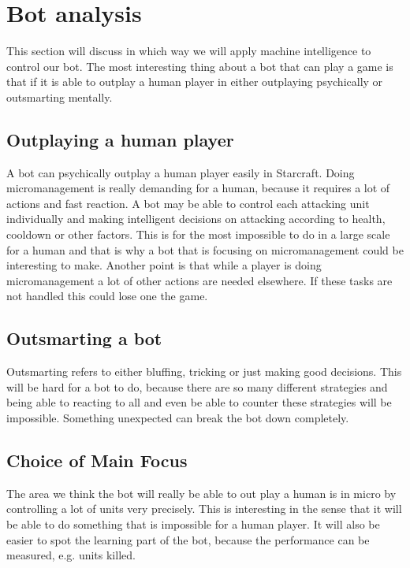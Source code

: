 \section{Bot analysis}
	This section will discuss in which way we will apply machine intelligence to control our bot. The most interesting thing about a bot that can play a game is that if it is able to outplay a 
	human player in either outplaying psychically or outsmarting mentally. 
	
	\subsection*{Outplaying a human player}
		A bot can psychically outplay a human player easily in Starcraft. 
		Doing micromanagement is really demanding for a human, because it requires a lot of actions and fast reaction. A bot may be able to control each 
		attacking unit individually and making intelligent decisions on attacking according to health, cooldown or other factors. This is for the most 
		impossible to do in a large scale for a human and that is why a bot that is focusing on micromanagement could be interesting to make. Another point 
		is that while a player is doing micromanagement a lot of other actions are needed elsewhere. If these tasks are not handled this could lose one the game.
		
	\subsection*{Outsmarting a bot}
		Outsmarting refers to either bluffing, tricking or just making good decisions. This will be hard for a bot to do, because there are so many 
		different strategies and being able to reacting to all and even be able to counter these strategies will be impossible. Something unexpected 
		can break the bot down completely.

\subsection{Choice of Main Focus}
	The area we think the bot will really be able to out play a human is in micro by controlling a lot of units very precisely. This is interesting in the sense that it will be able to do something that is impossible for a human player. It will also be easier to spot the learning part of the bot, because the performance can be measured, e.g. units killed.